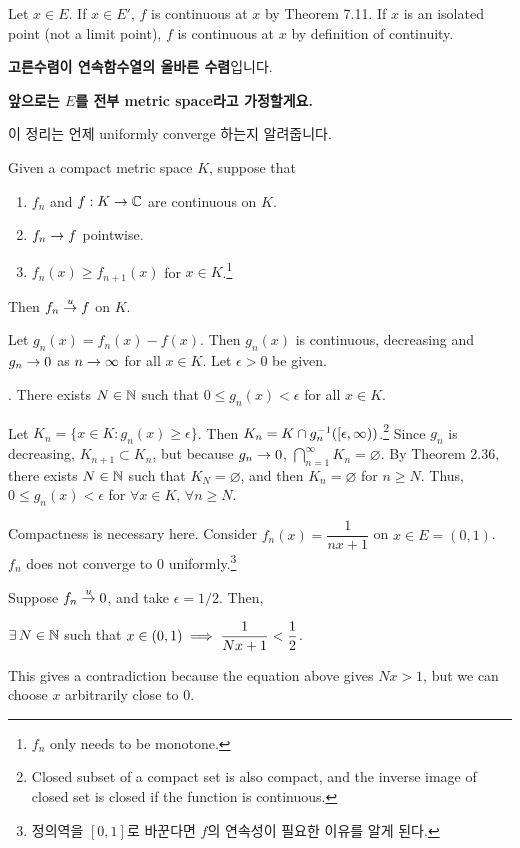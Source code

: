 \pf Let \(x \in E\). If \(x \in E'\), \(f\) is continuous at \(x\) by Theorem 7.11. If \(x\) is an isolated point (not a limit point), \(f\) is continuous at \(x\) by definition of continuity.

\textbf{고른수렴이 연속함수열의 올바른 수렴}입니다.

\textbf{앞으로는 \(E\)를 전부 metric space라고 가정할게요.}

이 정리는 언제 uniformly converge 하는지 알려줍니다.

  Given a compact metric space \(K\), suppose that
\begin{enumerate}
    \item \(f_n\) and \(f: K \rightarrow \mathbb{C}\) are continuous on \(K\).
    \item \(f_n \rightarrow f\) pointwise.
    \item \(f_n(x) \geq f_{n+1}(x)\) for \(x \in K\).\footnote{\(f_n\) only needs to be monotone.}
\end{enumerate}
Then \(f_n \overset{u}{\rightarrow} f\) on \(K\).

\pf Let \(g_n(x) = f_n(x) - f(x)\). Then \(g_n(x)\) is continuous, decreasing and \(g_n \rightarrow 0\) as \(n \rightarrow \infty\) for all \(x \in K\). Let \(\epsilon > 0\) be given.

\quad \claim. There exists \(N \in \mathbb{N}\) such that \(0 \leq g_n(x) < \epsilon\) for all \(x \in K\).

\quad \pf Let \(K_n = \{x \in K : g_n(x)\geq \epsilon\}\). Then \(K_n = K \cap g_n^{-1} ([\epsilon, \infty))\).\footnote{Closed subset of a compact set is also compact, and the inverse image of closed set is closed if the function is continuous.} Since \(g_n\) is decreasing, \(K_{n+1}\subset K_n\), but because \(g_n \rightarrow 0\), \(\bigcap_{n=1}^\infty K_n = \varnothing\). By Theorem 2.36, there exists \(N \in \mathbb{N}\) such that \(K_N = \varnothing\), and then \(K_n = \varnothing\) for \(n \geq N\). Thus, \(0 \leq g_n(x) < \epsilon\) for \(\forall x \in K\), \(\forall n \geq N\).

\rmk Compactness is necessary here. Consider \(f_n(x) = \dfrac{1}{nx + 1}\) on \(x \in E = (0, 1)\). \(f_n\) does not converge to \(0\) uniformly.\footnote{정의역을 \([0, 1]\)로 바꾼다면 \(f\)의 연속성이 필요한 이유를 알게 된다.}

\pf Suppose \(f_n \overset{u}{\rightarrow} 0\), and take \(\epsilon = 1/2\). Then,
\begin{center}
    \(\exists N \in \N\) such that \(\displaystyle x \in (0, 1) \implies \frac{1}{Nx + 1} < \frac{1}{2}\).
\end{center}
This gives a contradiction because the equation above gives \(Nx > 1\), but we can choose \(x\) arbitrarily close to \(0\).

